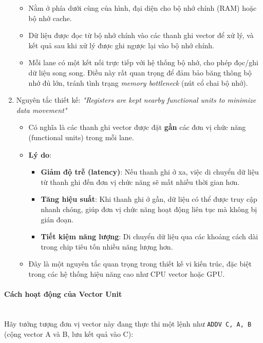 \documentclass[a4paper]{article}
\begin{document}
\begin{enumerate}
    \begin{itemize}
        \item Nằm ở phía dưới cùng của hình, đại diện cho bộ nhớ chính (RAM) hoặc bộ nhớ cache.
        \item Dữ liệu được đọc từ bộ nhớ chính vào các thanh ghi vector để xử lý, và kết quả sau khi xử lý được ghi ngược lại vào bộ nhớ chính.
        \item Mỗi lane có một kết nối trực tiếp với hệ thống bộ nhớ, cho phép đọc/ghi dữ liệu song song. Điều này rất quan trọng để đảm bảo băng thông bộ nhớ đủ lớn, tránh tình trạng \textit{memory bottleneck} (nút cổ chai bộ nhớ).
    \end{itemize}
    
    \item Nguyên tắc thiết kế: \textit{"Registers are kept nearby functional units to minimize data movement"}
    \begin{itemize}
        \item Có nghĩa là các thanh ghi vector được đặt \textbf{gần} các đơn vị chức năng (functional units) trong mỗi lane.
        \item \textbf{Lý do}:
        \begin{itemize}
            \item \textbf{Giảm độ trễ (latency)}: Nếu thanh ghi ở xa, việc di chuyển dữ liệu từ thanh ghi đến đơn vị chức năng sẽ mất nhiều thời gian hơn.
            \item \textbf{Tăng hiệu suất}: Khi thanh ghi ở gần, dữ liệu có thể được truy cập nhanh chóng, giúp đơn vị chức năng hoạt động liên tục mà không bị gián đoạn.
            \item \textbf{Tiết kiệm năng lượng}: Di chuyển dữ liệu qua các khoảng cách dài trong chip tiêu tốn nhiều năng lượng hơn.
        \end{itemize}
        \item Đây là một nguyên tắc quan trọng trong thiết kế vi kiến trúc, đặc biệt trong các hệ thống hiệu năng cao như CPU vector hoặc GPU.
    \end{itemize}
\end{enumerate}

\paragraph{Cách hoạt động của Vector Unit}\leavevmode\\
Hãy tưởng tượng đơn vị vector này đang thực thi một lệnh như \texttt{ADDV C, A, B} (cộng vector A và B, lưu kết quả vào C):
\end{document}
